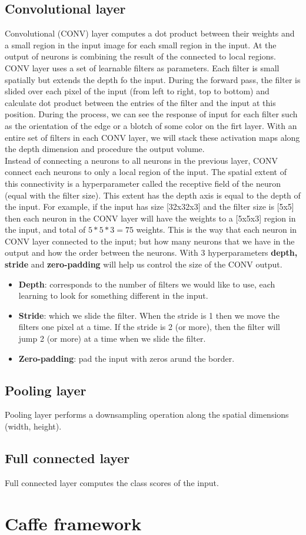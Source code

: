 \subsection{Convolutional layer}
Convolutional (CONV) layer computes a dot product between their weights and a small region in the input image for each small region in the input. At the output of neurons is combining the result  of the connected to local regions.\\[0.2cm]
CONV layer uses a set of learnable filters as parameters. Each filter is small spatially but extends the depth fo the input. During the forward pass, the filter is slided over each pixel of the input (from left to right, top to bottom) and calculate dot product between the entries of the filter and the input at this position. During the process, we can see the response of input for each filter such as the orientation of the edge or a blotch of some color on the firt layer. With an entire set of filters in each CONV layer, we will stack these activation maps along the depth dimension and procedure the output volume.\\[0.2cm]
Instead of connecting a neurons to all neurons in the previous layer, CONV connect each neurons to only a local region of the input. The spatial extent of this connectivity is a hyperparameter called the receptive field of the neuron (equal with the filter size). This extent has the depth axis is equal to the depth of the input. For example, if the input has size [32x32x3] and the filter size is [5x5] then each neuron in the CONV layer will have the weights to a [5x5x3] region in the input, and total of $5*5*3 = 75$ weights. This is the way that each neuron in CONV layer connected to the input; but how many neurons that we have in the output and how the order between the neurons. With 3 hyperparameters \textbf{depth, stride} and \textbf{zero-padding} will help us control the size of the CONV output.
\begin{itemize}
	\item \textbf{Depth}: corresponds to the number of filters we would like to use, each learning to look for something different in the input.
	\item \textbf{Stride}:  which we slide the filter. When the stride is 	1 then we move the filters one pixel at a time. If the stride is 2 (or more), then the filter will jump 2 (or more) at a time when we slide the filter.
	\item \textbf{Zero-padding}: pad the input with zeros arund the border.
\end{itemize}
\subsection{Pooling layer}
Pooling layer performs a downsampling operation along the spatial dimensions (width, height).
\subsection{Full connected layer}
Full connected layer computes the class scores of the input.
\section{Caffe framework}